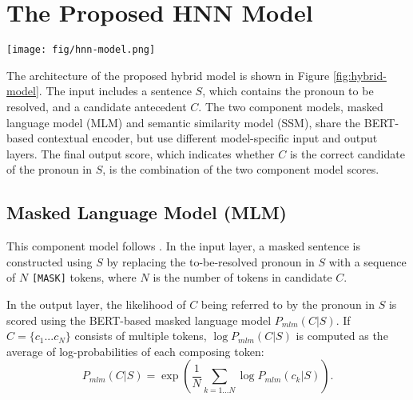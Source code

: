 \documentclass[11pt,a4paper]{article}
\begin{document}
\section{The Proposed HNN Model}
\label{sec:method}
\begin{figure*}
	\centering
	\vspace{-1mm}
{
 	\texttt{[image: fig/hnn-model.png]}


    }
\caption{Architecture of the hybrid model for commonsense reasoning. The model consists of two component models, a masked language model (MLM) and a semantic similarity model (SSM). The input includes the sentence $S$, which contains a pronoun to be resolve, and a candidate antecedent $C$. The two component models share the BERT-based contextual encoder, but use different model-specific input and output layers. The final output score is the combination of the two component model scores.}
\label{fig:hybrid-model}
\end{figure*}

The architecture of the proposed hybrid model is shown in Figure \ref{fig:hybrid-model}. The input includes a sentence $S$, which contains the pronoun to be resolved, and a candidate antecedent $C$. The two component models, masked language model (MLM) and semantic similarity model (SSM), share the BERT-based contextual encoder, but use different model-specific input and output layers. The final output score, which indicates whether $C$ is the correct candidate of the pronoun in $S$, is the combination of the two component model scores.

\subsection{Masked Language Model (MLM)}
\label{sec:mlm}

This component model follows \citet{kocijan2019surprisingly}.
In the input layer, a masked sentence is constructed using $S$ by replacing the to-be-resolved pronoun in $S$ with a sequence of $N$ \texttt{[MASK]} tokens, where $N$ is the number of tokens in candidate $C$.

In the output layer, the likelihood of $C$ being referred to by the pronoun in $S$ is scored using the BERT-based masked language model $P_{mlm}(C|S)$. If $C=\{c_1...c_N\}$ consists of multiple tokens, $\log P_{mlm} (C|S)$ is computed as the average of log-probabilities of each composing token:
\begin{equation}
P_{mlm}(C|S)= \exp{ \left ( \frac{1}{N} \sum_{k=1...N} \log P_{mlm}(c_k|S) \right )}.
\label{eqn:mlm}
\end{equation}
\end{document}
